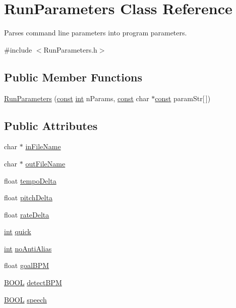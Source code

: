 \hypertarget{class_run_parameters}{}\section{Run\+Parameters Class Reference}
\label{class_run_parameters}


Parses command line parameters into program parameters.  




{\ttfamily \#include $<$Run\+Parameters.\+h$>$}

\subsection*{Public Member Functions}
\begin{DoxyCompactItemize}
\item 
\hyperlink{class_run_parameters_a38892c16c752f2d90ab16f6e1d7d121c}{Run\+Parameters} (\hyperlink{getopt1_8c_a2c212835823e3c54a8ab6d95c652660e}{const} \hyperlink{xmltok_8h_a5a0d4a5641ce434f1d23533f2b2e6653}{int} n\+Params, \hyperlink{getopt1_8c_a2c212835823e3c54a8ab6d95c652660e}{const} char $\ast$\hyperlink{getopt1_8c_a2c212835823e3c54a8ab6d95c652660e}{const} param\+Str\mbox{[}$\,$\mbox{]})
\end{DoxyCompactItemize}
\subsection*{Public Attributes}
\begin{DoxyCompactItemize}
\item 
char $\ast$ \hyperlink{class_run_parameters_adf41fbdff2f0a06e80d01dc5e74fdcc0}{in\+File\+Name}
\item 
char $\ast$ \hyperlink{class_run_parameters_a7d9b2c35b0da71abde1327c13b9994bd}{out\+File\+Name}
\item 
float \hyperlink{class_run_parameters_af94d2637beb78d3b5faa53ccb237320d}{tempo\+Delta}
\item 
float \hyperlink{class_run_parameters_a84894f575f0d17ed4b7930549b08cafc}{pitch\+Delta}
\item 
float \hyperlink{class_run_parameters_ae0ed68209b3117dd1f76fbf8c707abe8}{rate\+Delta}
\item 
\hyperlink{xmltok_8h_a5a0d4a5641ce434f1d23533f2b2e6653}{int} \hyperlink{class_run_parameters_ad8b6187b7f1f64bcbd9e7e4ce524bafb}{quick}
\item 
\hyperlink{xmltok_8h_a5a0d4a5641ce434f1d23533f2b2e6653}{int} \hyperlink{class_run_parameters_a24848615322f5dc4361e8296da14eb23}{no\+Anti\+Alias}
\item 
float \hyperlink{class_run_parameters_a2b5559799259a982955559b53b35d67d}{goal\+B\+PM}
\item 
\hyperlink{nfilterkit_8h_a3be13892ae7076009afcf121347dd319}{B\+O\+OL} \hyperlink{class_run_parameters_a758a516467f37c9de3ef68e912b09e1b}{detect\+B\+PM}
\item 
\hyperlink{nfilterkit_8h_a3be13892ae7076009afcf121347dd319}{B\+O\+OL} \hyperlink{class_run_parameters_a61b3a50c1db33d73133fa53bbabf1cb2}{speech}
\end{DoxyCompactItemize}


